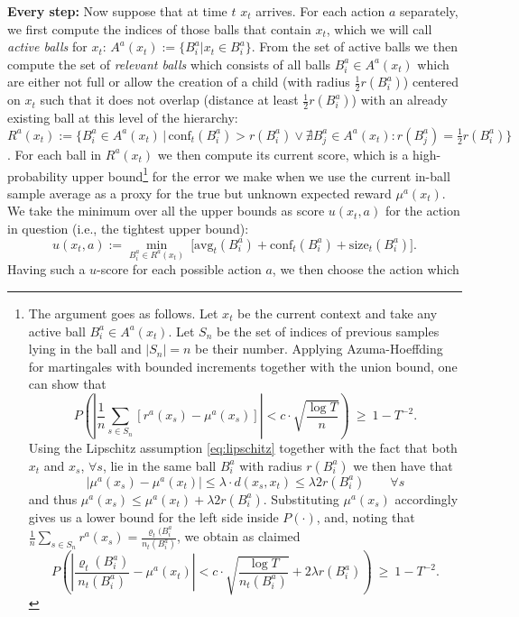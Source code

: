 \documentclass{llncs}
\begin{document}
{\bf \noindent Every step:} Now suppose that at time $t$ $x_t$ arrives. For each action $a$ separately, we first
compute the indices of those balls that contain $x_t$, which we will call {\em active
balls} for $x_t$: $A^a(x_t):=\{B_i^a| x_t \in B_i^a \}$. From the set of active balls we then 
compute the set of {\em relevant balls} which consists of all balls $B_i^a \in A^a(x_t)$ which
are either not full or allow the creation of a child (with radius $\frac{1}{2}r(B_i^a)$) centered on $x_t$
such that it does not overlap (distance at least $\frac{1}{2}r(B_i^a)$) with an already existing 
ball at this level of the hierarchy: $R^a(x_t):=\{B_i^a\in A^a(x_t) \, | \,\text{conf}_t(B_i^a)>r(B_i^a) 
\vee \nexists B_j^a \in A^a(x_t):r(B_j^a)=\frac{1}{2}r(B_i^a)\}$.
For each ball in $R^a(x_t)$ we then compute its current score, which is a 
high-probability upper bound\footnote{
The argument 
goes as follows. Let $x_t$ be the current context and take any active ball $B_i^a\in A^a(x_t)$.
Let $S_n$ be the set of indices of previous samples lying in the ball and $|S_n|=n$ be their
number. Applying Azuma-Hoeffding for martingales with bounded increments together with the 
union bound, one can show that
\[
P\left(\left|\frac{1}{n} \sum_{s\in S_n} [r^a(x_s)-\mu^a(x_s)]\right| < c\cdot \sqrt{\frac{\log T}{n}}\right) \ \ge \ 1-T^{-2}.
\]  
Using the Lipschitz assumption \eqref{eq:lipschitz} together with the fact that both $x_t$ and
$x_s$, $\forall s$, lie in the same ball $B_i^a$ with radius $r(B_i^a)$ we then have that
\[
|\mu^a(x_s)-\mu^a(x_t)|\le \lambda\cdot d(x_s,x_t) \le \lambda 2r(B_i^a)  \qquad \forall s
\]
and thus $\mu^a(x_s)\le\mu^a(x_t)+\lambda 2r(B_i^a)$. Substituting $\mu^a(x_s)$ accordingly gives
us a lower bound for the left side inside $P(\cdot)$, and, noting that 
$\frac{1}{n} \sum_{s\in S_n} r^a(x_s)=\frac{\varrho_t(B_i^a}{n_t(B_i^a)}$, we obtain
as claimed
\[
P\left(\left|\frac{\varrho_t(B_i^a)}{n_t(B_i^a)}-\mu^a(x_t)\right| < c \cdot \sqrt{\frac{\log T}{n_t(B_i^a)}} + 2\lambda r(B_i^a) \right) \ \ge \ 1-T^{-2}.
\]}  
for the error we make when we use the current in-ball sample average as a proxy for the true
but unknown expected reward $\mu^a(x_t)$. We take the minimum over all the upper bounds as 
score $u(x_t,a)$ for the action in question (i.e., the tightest upper bound):
\begin{equation}
u(x_t,a):= \min_{B_i^a \in R^a(x_t)} \ \bigl[\text{avg}_t(B_i^a)+
\text{conf}_t(B_i^a)+\text{size}_t(B_i^a) \bigr].
\label{eq:ucb}
\end{equation}
Having such a $u$-score for each possible action $a$, we then choose the action which
\end{document}
